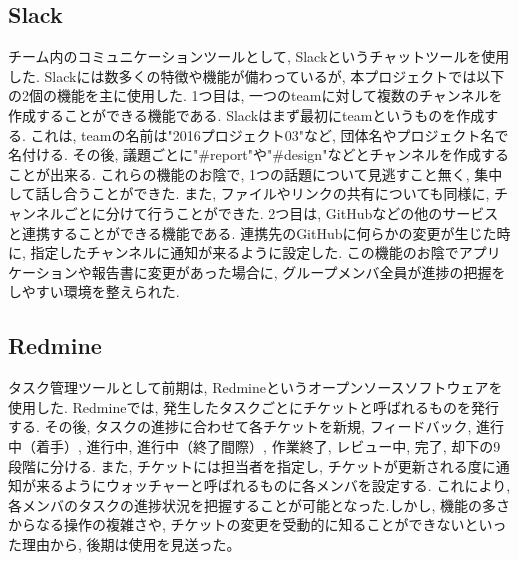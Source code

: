 \subsection{Slack}%
チーム内のコミュニケーションツールとして, Slackというチャットツールを使用した. Slackには数多くの特徴や機能が備わっているが, 本プロジェクトでは以下の2個の機能を主に使用した. 1つ目は, 一つのteamに対して複数のチャンネルを作成することができる機能である. Slackはまず最初にteamというものを作成する. これは, teamの名前は"2016プロジェクト03"など, 団体名やプロジェクト名で名付ける. その後, 議題ごとに"#report"や"#design"などとチャンネルを作成することが出来る. これらの機能のお陰で, 1つの話題について見逃すこと無く, 集中して話し合うことができた. また, ファイルやリンクの共有についても同様に, チャンネルごとに分けて行うことができた. 2つ目は, GitHubなどの他のサービスと連携することができる機能である. 連携先のGitHubに何らかの変更が生じた時に, 指定したチャンネルに通知が来るように設定した. この機能のお陰でアプリケーションや報告書に変更があった場合に, グループメンバ全員が進捗の把握をしやすい環境を整えられた. 

\subsection{Redmine}%
タスク管理ツールとして前期は, Redmineというオープンソースソフトウェアを使用した. Redmineでは, 発生したタスクごとにチケットと呼ばれるものを発行する. その後, タスクの進捗に合わせて各チケットを新規, フィードバック, 進行中（着手）, 進行中, 進行中（終了間際）, 作業終了, レビュー中, 完了, 却下の9段階に分ける. また, チケットには担当者を指定し, チケットが更新される度に通知が来るようにウォッチャーと呼ばれるものに各メンバを設定する. これにより, 各メンバのタスクの進捗状況を把握することが可能となった.しかし, 機能の多さからなる操作の複雑さや, チケットの変更を受動的に知ることができないといった理由から, 後期は使用を見送った。

